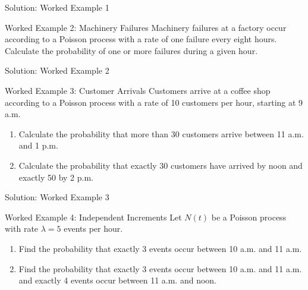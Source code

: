\documentclass[
  ignorenonframetext,
  aspectratio=169,
]{beamer}
\providecommand{\tightlist}{%
  \setlength{\itemsep}{0pt}\setlength{\parskip}{0pt}}
\begin{document}
\begin{frame}{Solution: Worked Example 1}
\protect{}\label{solution-worked-example-1}
\end{frame}

\begin{frame}{Worked Example 2: Machinery Failures}
\protect{}\label{worked-example-2-machinery-failures}
Machinery failures at a factory occur according to a Poisson process
with a rate of one failure every eight hours. Calculate the probability
of one or more failures during a given hour.
\end{frame}

\begin{frame}{Solution: Worked Example 2}
\protect{}\label{solution-worked-example-2}
\end{frame}

\begin{frame}{Worked Example 3: Customer Arrivals}
\protect{}\label{worked-example-3-customer-arrivals}
Customers arrive at a coffee shop according to a Poisson process with a
rate of 10 customers per hour, starting at 9 a.m.

\begin{enumerate}
\tightlist
\item
  Calculate the probability that more than 30 customers arrive between
  11 a.m. and 1 p.m.
\item
  Calculate the probability that exactly 30 customers have arrived by
  noon and exactly 50 by 2 p.m.
\end{enumerate}
\end{frame}

\begin{frame}{Solution: Worked Example 3}
\protect{}\label{solution-worked-example-3}
\end{frame}

\begin{frame}{Worked Example 4: Independent Increments}
\protect{}\label{worked-example-4-independent-increments}
Let \(N(t)\) be a Poisson process with rate \(\lambda=5\) events per
hour.

\begin{enumerate}
\tightlist
\item
  Find the probability that exactly 3 events occur between 10 a.m. and
  11 a.m.
\item
  Find the probability that exactly 3 events occur between 10 a.m. and
  11 a.m. and exactly 4 events occur between 11 a.m. and noon.
\end{enumerate}
\end{frame}
\end{document}
